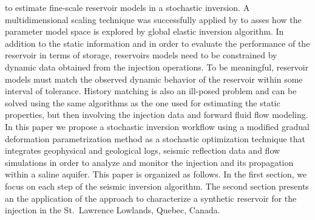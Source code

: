 \citep{Caers2006} to estimate fine-scale reservoir models in a stochastic
inversion. A multidimensional scaling technique was successfully applied by
\citet{Azevedo2013} to asses how the parameter model space is explored by global
elastic inversion algorithm.
In addition to the static information and in order to evaluate the performance
of the reservoir in terms of  storage, reservoirs models need to be
constrained by dynamic data obtained from the  injection operations. To
be meaningful, reservoir models must match the observed dynamic behavior of the
reservoir within some interval of tolerance. History matching is also an
ill-posed problem and can be solved using the same algorithms as the one used
for estimating the static properties, but then involving the injection data and
forward fluid flow modeling.
In this paper we propose a stochastic inversion workflow using a modified
gradual deformation parametrization method \citep{Roggero1998} as a stochastic
optimization technique that integrates geophysical and geological logs, seismic
reflection data and  flow simulations in order to analyze and monitor
the  injection and its propagation within a saline aquifer.  This paper
is organized as follows. In the first section, we focus on each step of the
seismic inversion algorithm. The second section presents an the application of
the approach to characterize a synthetic reservoir for the  injection in
the St.\ Lawrence Lowlands, Quebec, Canada.
